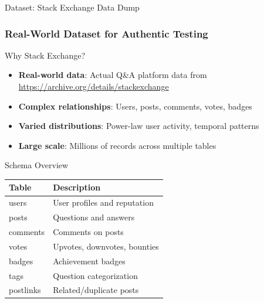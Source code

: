 \documentclass[smaller]{beamer}
\begin{document}
\begin{frame}{Dataset: Stack Exchange Data Dump}
\frametitle{Real-World Dataset for Authentic Testing}

\begin{block}{Why Stack Exchange?}
\begin{itemize}
    \item \textbf{Real-world data}: Actual Q\&A platform data from \url{https://archive.org/details/stackexchange}
    \item \textbf{Complex relationships}: Users, posts, comments, votes, badges
    \item \textbf{Varied distributions}: Power-law user activity, temporal patterns
    \item \textbf{Large scale}: Millions of records across multiple tables
\end{itemize}
\end{block}

\begin{exampleblock}{Schema Overview}
\begin{tabular}{ll}
\toprule
Table & Description \\
\midrule
users & User profiles and reputation \\
posts & Questions and answers \\
comments & Comments on posts \\
votes & Upvotes, downvotes, bounties \\
badges & Achievement badges \\
tags & Question categorization \\
postlinks & Related/duplicate posts \\
\bottomrule
\end{tabular}
\end{exampleblock}

\end{frame}
\end{document}
